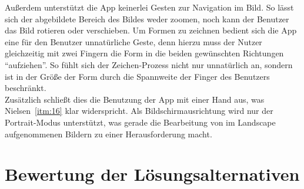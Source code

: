  Außerdem unterstützt die App keinerlei Gesten zur Navigation im Bild. So lässt sich der abgebildete Bereich des Bildes weder zoomen, noch kann der Benutzer das Bild rotieren oder verschieben. Um Formen zu zeichnen bedient sich die App eine für den Benutzer unnatürliche Geste, denn hierzu muss der Nutzer gleichzeitig mit zwei Fingern die Form in die beiden gewünschten Richtungen ``aufziehen''. So fühlt sich der Zeichen-Prozess nicht nur unnatürlich an, sondern ist in der Größe der Form durch die Spannweite der Finger des Benutzers beschränkt. \\
 
 Zusätzlich schließt dies die Benutzung der App mit einer Hand aus, was Nielsen~\autoref{itm:16} klar widerspricht. Als Bildschirmausrichtung wird nur der Portrait-Modus unterstützt, was gerade die Bearbeitung von im Landscape aufgenommenen Bildern zu einer Herausforderung macht. \\

\section{Bewertung der Lösungsalternativen}

